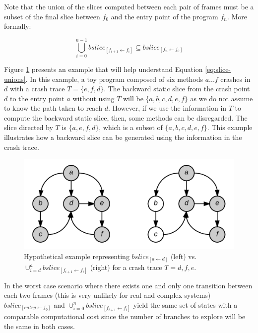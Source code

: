 \documentclass[12pt]{report}
\begin{document}
Note that the union of the slices computed between each pair of frames
must be a subset of the final slice between \(f_0\) and the entry point
of the program \(f_n\). More formally:

\begin{equation}
\bigcup_{i=0}^{n-1} bslice_{[f_{i+1} \leftarrow f_i]} \subseteq bslice_{[f_n \leftarrow f_0]}
\label{eq:slice-unions}
\end{equation}

Figure \ref{fig:jcharming-slice} presents an example that will help
understand Equation \ref{eq:slice-unions}. In this example, a toy
program composed of six methods \(a...f\) crashes in \(d\) with a crash
trace \(T = \{e, f, d\}\). The backward static slice from the crash
point \(d\) to the entry point \(a\) without using \(T\) will be
\(\{a, b, c, d, e, f\}\) as we do not assume to know the path taken to
reach \(d\). However, if we use the information in \(T\) to compute the
backward static slice, then, some methods can be disregarded. The slice
directed by \(T\) is \(\{a, e, f, d\}\), which is a subset of
\(\{a, b, c, d, e, f\}\). This example illustrates how a backward slice
can be generated using the information in the crash trace.

\begin{figure}
\centering
\includegraphics[scale=0.25]{media/chap8/jcharming-slices.png}
\caption{Hypothetical example representing $bslice_{[a \leftarrow d]}$ (left) vs. $\cup_{i=d}^{a} bslice_{[f_{i+1} \leftarrow f_i]}$ (right) for a crash trace $T={d, f, e}$.
\label{fig:jcharming-slice}}
\end{figure}

In the worst case scenario where there exists one and only one
transition between each two frames (this is very unlikely for real and
complex systems) \(bslice_{[entry \leftarrow f_0]}\) and
\(\cup_{i=0}^n bslice_{[f_{i+1} \leftarrow f_i]}\) yield the same set of
states with a comparable computational cost since the number of branches
to explore will be the same in both cases.
\end{document}
